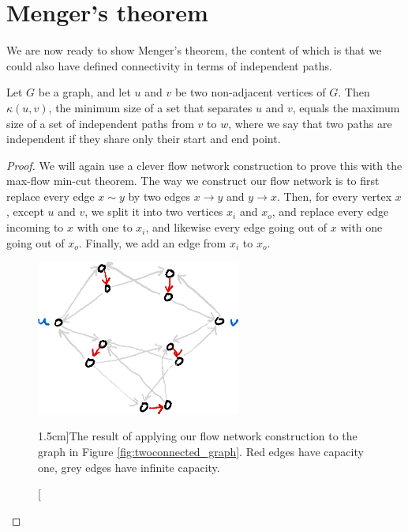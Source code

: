 \documentclass[nobib]{tufte-handout}
\begin{document}
\section{Menger's theorem}

We are now ready to show Menger's theorem, the content of which is that we could also have defined connectivity in terms of independent paths.

\begin{theorem}[Menger]\label{thm:menger_local}
  Let $G$ be a graph, and let $u$ and $v$ be two non-adjacent vertices of $G$. Then $\kappa(u,v)$, the minimum size of a set that separates $u$ and $v$, equals the maximum size of a set of independent paths from $v$ to $w$, where we say that two paths are independent if they share only their start and end point.

  \begin{proof}
    We will again use a clever flow network construction to prove this with the max-flow min-cut theorem. The way we construct our flow network is to first replace every edge $x\sim y$ by two edges $x\to y$ and $y\to x$. Then, for every vertex $x$, except $u$ and $v$, we split it into two vertices $x_i$ and $x_o$, and replace every edge incoming to $x$ with one to $x_i$, and likewise every edge going out of $x$ with one going out of $x_o$. Finally, we add an edge from $x_i$ to $x_o$.

    \begin{figure}
      \centering
      \includegraphics[width=0.6\textwidth]{graphics/L10_connectivity/menger_theorem_construction.png}
      \caption[][1.5cm]{The result of applying our flow network construction to the graph in Figure \ref{fig:twoconnected_graph}. Red edges have capacity one, grey edges have infinite capacity.}
      \label{fig:menger_thm_construction}
    \end{figure}


\end{proof}
\end{theorem}
\end{document}
